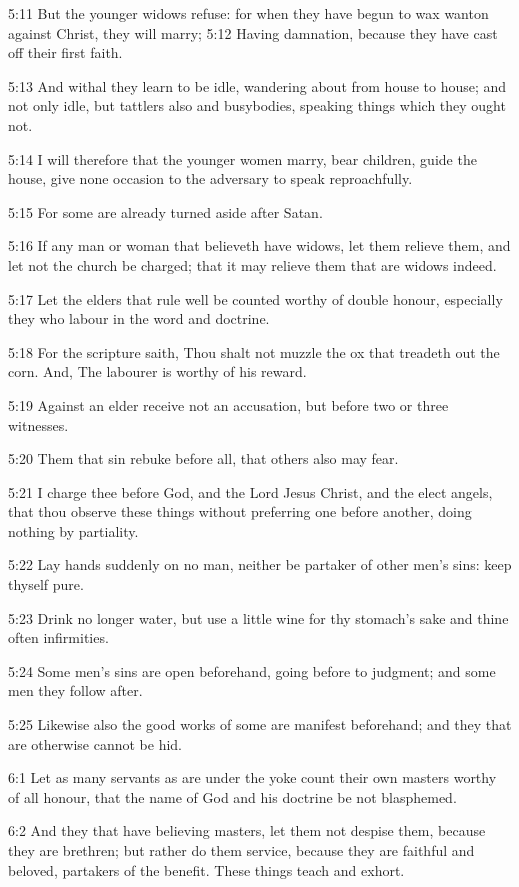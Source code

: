 5:11 But the younger widows refuse: for when they have begun to wax
wanton against Christ, they will marry; 5:12 Having damnation, because
they have cast off their first faith.

5:13 And withal they learn to be idle, wandering about from house to
house; and not only idle, but tattlers also and busybodies, speaking
things which they ought not.

5:14 I will therefore that the younger women marry, bear children,
guide the house, give none occasion to the adversary to speak
reproachfully.

5:15 For some are already turned aside after Satan.

5:16 If any man or woman that believeth have widows, let them relieve
them, and let not the church be charged; that it may relieve them that
are widows indeed.

5:17 Let the elders that rule well be counted worthy of double honour,
especially they who labour in the word and doctrine.

5:18 For the scripture saith, Thou shalt not muzzle the ox that
treadeth out the corn. And, The labourer is worthy of his reward.

5:19 Against an elder receive not an accusation, but before two or
three witnesses.

5:20 Them that sin rebuke before all, that others also may fear.

5:21 I charge thee before God, and the Lord Jesus Christ, and the
elect angels, that thou observe these things without preferring one
before another, doing nothing by partiality.

5:22 Lay hands suddenly on no man, neither be partaker of other men's
sins: keep thyself pure.

5:23 Drink no longer water, but use a little wine for thy stomach's
sake and thine often infirmities.

5:24 Some men's sins are open beforehand, going before to judgment;
and some men they follow after.

5:25 Likewise also the good works of some are manifest beforehand; and
they that are otherwise cannot be hid.

6:1 Let as many servants as are under the yoke count their own masters
worthy of all honour, that the name of God and his doctrine be not
blasphemed.

6:2 And they that have believing masters, let them not despise them,
because they are brethren; but rather do them service, because they
are faithful and beloved, partakers of the benefit. These things teach
and exhort.

